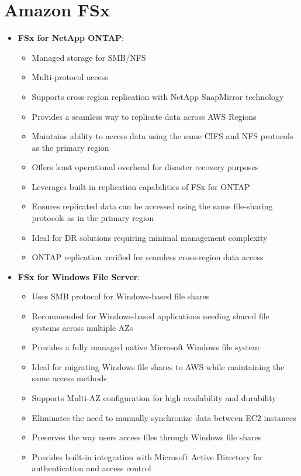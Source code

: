 \documentclass[11pt,a4paper]{report}
\begin{document}
\section{Amazon FSx}

\begin{itemize}
  \item \textbf{FSx for NetApp ONTAP}:
\begin{itemize}
  \item Managed storage for SMB/NFS
  \item Multi-protocol access
  \item Supports cross-region replication with NetApp SnapMirror technology
  \item Provides a seamless way to replicate data across AWS Regions
  \item Maintains ability to access data using the same CIFS and NFS protocols as the primary region
  \item Offers least operational overhead for disaster recovery purposes
  \item Leverages built-in replication capabilities of FSx for ONTAP
  \item Ensures replicated data can be accessed using the same file-sharing protocols as in the primary region
  \item Ideal for DR solutions requiring minimal management complexity
  \item ONTAP replication verified for seamless cross-region data access
\end{itemize}
  \item \textbf{FSx for Windows File Server}:
\begin{itemize}
  \item Uses SMB protocol for Windows-based file shares
  \item Recommended for Windows-based applications needing shared file systems across multiple AZs
  \item Provides a fully managed native Microsoft Windows file system
  \item Ideal for migrating Windows file shares to AWS while maintaining the same access methods
  \item Supports Multi-AZ configuration for high availability and durability
  \item Eliminates the need to manually synchronize data between EC2 instances
  \item Preserves the way users access files through Windows file shares
  \item Provides built-in integration with Microsoft Active Directory for authentication and access control

\end{itemize}
\end{itemize}
\end{document}
